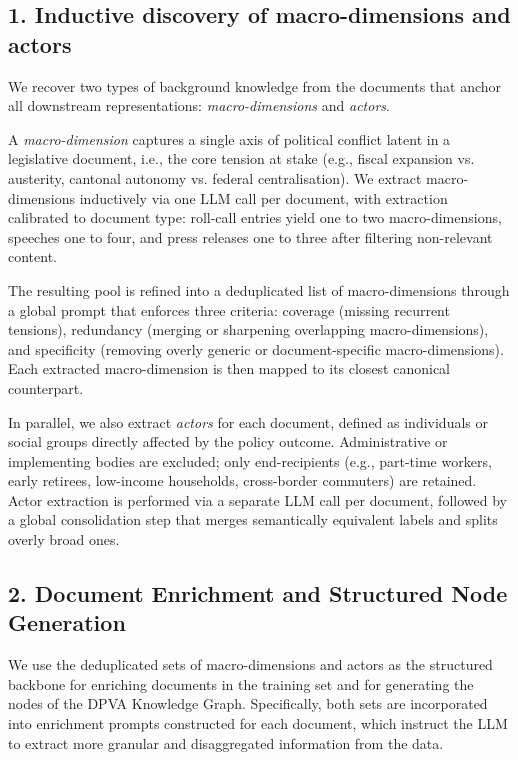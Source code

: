 \documentclass[letterpaper]{article}
\begin{document}
\subsection{1. Inductive discovery of macro-dimensions and actors}

We recover two types of background knowledge from the documents that anchor all downstream representations: \emph{macro-dimensions} and \emph{actors}.

A \emph{macro-dimension} captures a single axis of political conflict latent in a legislative document, i.e., the core tension at stake (e.g., fiscal expansion vs. austerity, cantonal autonomy vs. federal centralisation). We extract macro-dimensions inductively via one LLM call per document, with extraction calibrated to document type: roll-call entries yield one to two macro-dimensions, speeches one to four, and press releases one to three after filtering non-relevant content.

The resulting pool is refined into a deduplicated list of macro-dimensions through a global prompt that enforces three criteria: coverage (missing recurrent tensions), redundancy (merging or sharpening overlapping macro-dimensions), and specificity (removing overly generic or document-specific macro-dimensions). Each extracted macro-dimension is then mapped to its closest canonical counterpart.

In parallel, we also extract \emph{actors} for each document, defined as individuals or social groups directly affected by the policy outcome. Administrative or implementing bodies are excluded; only end-recipients (e.g., part-time workers, early retirees, low-income households, cross-border commuters) are retained. Actor extraction is performed via a separate LLM call per document, followed by a global consolidation step that merges semantically equivalent labels and splits overly broad ones.

\subsection{2. Document Enrichment and Structured Node Generation}

We use the deduplicated sets of macro-dimensions and actors as the structured backbone for enriching documents in the training set and for generating the nodes of the DPVA Knowledge Graph. Specifically, both sets are incorporated into enrichment prompts constructed for each document, which instruct the LLM to extract more granular and disaggregated information from the data.
\end{document}

